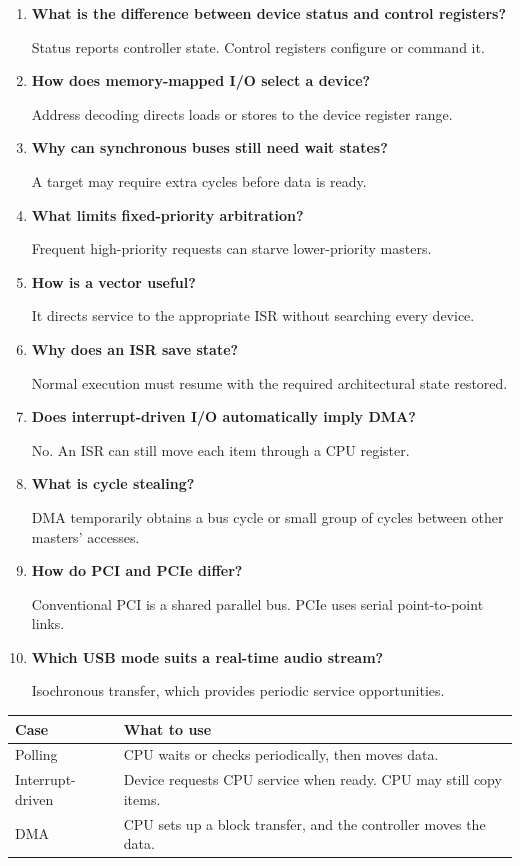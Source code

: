 \documentclass[12pt,a4paper]{article}
\newcommand{\Q}[1]{\textbf{#1}\par\noindent\ignorespaces}
\begin{document}
\begin{tcolorbox}[exambox,title={Frequently Asked / Viva Questions}]
\begin{enumerate}[topsep=0pt, label=\textbf{Q\arabic*.}, itemsep=5pt]
\item \Q{What is the difference between device status and control registers?}
Status reports controller state. Control registers configure or command it.
\item \Q{How does memory-mapped I/O select a device?}
Address decoding directs loads or stores to the device register range.
\item \Q{Why can synchronous buses still need wait states?}
A target may require extra cycles before data is ready.
\item \Q{What limits fixed-priority arbitration?}
Frequent high-priority requests can starve lower-priority masters.
\item \Q{How is a vector useful?}
It directs service to the appropriate ISR without searching every device.
\item \Q{Why does an ISR save state?}
Normal execution must resume with the required architectural state restored.
\item \Q{Does interrupt-driven I/O automatically imply DMA?}
No. An ISR can still move each item through a CPU register.
\item \Q{What is cycle stealing?}
DMA temporarily obtains a bus cycle or small group of cycles between other masters' accesses.
\item \Q{How do PCI and PCIe differ?}
Conventional PCI is a shared parallel bus. PCIe uses serial point-to-point links.
\item \Q{Which USB mode suits a real-time audio stream?}
Isochronous transfer, which provides periodic service opportunities.
\end{enumerate}
\end{tcolorbox}
\begin{tcolorbox}[tikzbox,title={Summary comparison}]
\begin{tabularx}{\linewidth}{|B{4cm}|Y|}\hline
\textbf{Case} & \textbf{What to use} \\ \hline
Polling & CPU waits or checks periodically, then moves data. \\ \hline
Interrupt-driven & Device requests CPU service when ready. CPU may still copy items. \\ \hline
DMA & CPU sets up a block transfer, and the controller moves the data. \\ \hline
\end{tabularx}
\end{tcolorbox}
\end{document}
